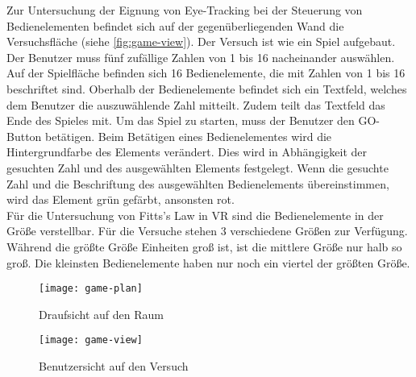 Zur Untersuchung der Eignung von Eye-Tracking bei der Steuerung von Bedienelementen befindet sich auf der gegenüberliegenden Wand die Versuchsfläche (siehe \autoref{fig:game-view}). Der Versuch ist wie ein Spiel aufgebaut. Der Benutzer muss fünf zufällige Zahlen von 1 bis 16 nacheinander auswählen. Auf der Spielfläche befinden sich 16 Bedienelemente, die mit Zahlen von 1 bis 16 beschriftet sind. Oberhalb der Bedienelemente befindet sich ein Textfeld, welches dem Benutzer die auszuwählende Zahl mitteilt. Zudem teilt das Textfeld das Ende des Spieles mit. Um das Spiel zu starten, muss der Benutzer den GO-Button betätigen. Beim Betätigen eines Bedienelementes wird die Hintergrundfarbe des Elements verändert. Dies wird in Abhängigkeit der gesuchten Zahl und des ausgewählten Elements festgelegt. Wenn die gesuchte Zahl und die Beschriftung des ausgewählten Bedienelements übereinstimmen, wird das Element grün gefärbt, ansonsten rot. \\
Für die Untersuchung von Fitts's Law in \ac{VR} sind die Bedienelemente in der Größe verstellbar. Für die Versuche stehen 3 verschiedene Größen zur Verfügung. Während die größte Größe  Einheiten groß ist, ist die mittlere Größe nur halb so groß. Die kleinsten Bedienelemente haben nur noch ein viertel der größten Größe. 


	

\begin{figure}[!htbp]
	\centering
	\texttt{[image: game-plan]}
	\caption[Draufsicht auf den Raum]{Draufsicht auf den Raum}
	\label{fig:game-plan}
\end{figure}

\begin{figure}[!htbp]
\centering
\texttt{[image: game-view]}
\caption[Benutzersicht auf den Versuch]{Benutzersicht auf den Versuch}
\label{fig:game-view}
\end{figure}

